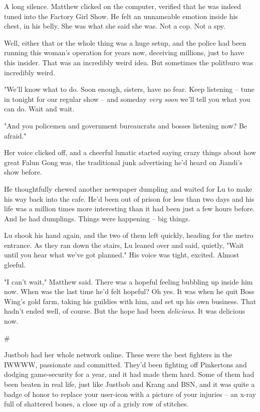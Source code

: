 A long silence. Matthew clicked on the computer, verified that he
was indeed tuned into the Factory Girl Show. He felt an unnameable
emotion inside his chest, in his belly. She was what she said she
was. Not a cop. Not a spy.

Well, either that or the whole thing was a huge setup, and the
police had been running this woman's operation for years now,
deceiving millions, just to have this insider. That was an
incredibly weird idea. But sometimes the politburo was incredibly
weird.

"We'll know what to do. Soon enough, sisters, have no fear. Keep
listening -- tune in tonight for our regular show -- and someday
\emph{very soon} we'll tell you what you can do. Wait and wait.

"And you policemen and government bureaucrats and bosses listening
now? Be afraid."

Her voice clicked off, and a cheerful lunatic started saying crazy
things about how great Falun Gong was, the traditional junk
advertising he'd heard on Jiandi's show before.

He thoughtfully chewed another newspaper dumpling and waited for Lu
to make his way back into the cafe. He'd been out of prison for
less than two days and his life was a million times more
interesting than it had been just a few hours before. And he had
dumplings. Things were happening -- big things.

Lu shook his hand again, and the two of them left quickly, heading
for the metro entrance. As they ran down the stairs, Lu leaned over
and said, quietly, "Wait until you hear what we've got planned."
His voice was tight, excited. Almost gleeful.

"I can't wait," Matthew said. There was a hopeful feeling bubbling
up inside him now. When was the last time he'd felt hopeful? Oh
yes. It was when he quit Boss Wing's gold farm, taking his guildies
with him, and set up his own business. That hadn't ended well, of
course. But the hope had been \emph{delicious}. It was delicious
now.

\#

Justbob had her whole network online. These were the best fighters
in the IWWWW, passionate and committed. They'd been fighting off
Pinkertons and dodging game-security for a year, and it had made
them hard. Some of them had been beaten in real life, just like
Justbob and Krang and BSN, and it was quite a badge of honor to
replace your user-icon with a picture of your injuries -- an x-ray
full of shattered bones, a close up of a grisly row of stitches.

